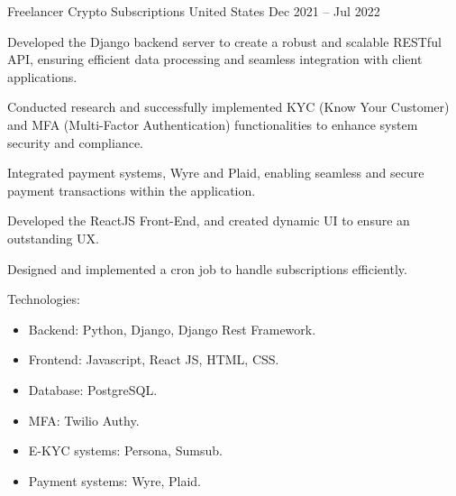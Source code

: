 \begin{cventries}
    \cventry
    {Freelancer} %
    {Crypto Subscriptions} %
    {United States} %
    {Dec 2021 – Jul 2022} %
    {
      \begin{cvitems} %
        \item {Developed the Django backend server to create a robust and scalable RESTful API, ensuring efficient data processing and seamless integration with client applications.}
        \item {Conducted research and successfully implemented KYC (Know Your Customer) and MFA (Multi-Factor Authentication) functionalities to enhance system security and compliance.}
        \item {Integrated payment systems, Wyre and Plaid, enabling seamless and secure payment transactions within the application.}
        \item {Developed the ReactJS Front-End, and created dynamic UI to ensure an outstanding UX.}
        \item {Designed and implemented a cron job to handle subscriptions efficiently.}
        \item {Technologies:
            \begin{itemize}
                \item {Backend: Python, Django, Django Rest Framework.}
                \item {Frontend: Javascript, React JS, HTML, CSS.}
                \item {Database: PostgreSQL.}
                \item {MFA: Twilio Authy.}
                \item {E-KYC systems: Persona, Sumsub.}
                \item {Payment systems: Wyre, Plaid.}
            \end{itemize}
        }
      \end{cvitems}
    }


\end{cventries}
